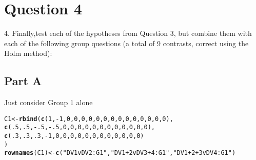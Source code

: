 \documentclass{article}\usepackage[]{graphicx}\usepackage[]{color}
\makeatletter
\newcommand{\hlnum}[1]{\textcolor[rgb]{0.686,0.059,0.569}{#1}}%
\newcommand{\hlstr}[1]{\textcolor[rgb]{0.192,0.494,0.8}{#1}}%
\newcommand{\hlopt}[1]{\textcolor[rgb]{0,0,0}{#1}}%
\newcommand{\hlstd}[1]{\textcolor[rgb]{0.345,0.345,0.345}{#1}}%
\newcommand{\hlkwb}[1]{\textcolor[rgb]{0.69,0.353,0.396}{#1}}%
\newcommand{\hlkwd}[1]{\textcolor[rgb]{0.737,0.353,0.396}{\textbf{#1}}}%
\newenvironment{kframe}{%
 \def\at@end@of@kframe{}%
 \ifinner\ifhmode%
  \def\at@end@of@kframe{\end{minipage}}%
  \begin{minipage}{\columnwidth}%
 \fi\fi%
 \def\FrameCommand##1{\hskip\@totalleftmargin \hskip-\fboxsep
 \colorbox{shadecolor}{##1}\hskip-\fboxsep
     \hskip-\linewidth \hskip-\@totalleftmargin \hskip\columnwidth}%
 \MakeFramed {\advance\hsize-\width
   \@totalleftmargin\z@ \linewidth\hsize
   \@setminipage}}%
 {\par\unskip\endMakeFramed%
 \at@end@of@kframe}
\newenvironment{knitrout}{}{} %
\makeatother
\begin{document}
\section{Question 4}
4. Finally,test each of the hypotheses from Question 3, but combine them with each of the following group questions (a total of 9 contrasts, correct using the Holm method): 

\subsection{Part A}
Just consider Group 1 alone
\begin{knitrout}
\color{fgcolor}\begin{kframe}
\begin{alltt}
\hlstd{C1} \hlkwb{<-} \hlkwd{rbind}\hlstd{(}\hlkwd{c}\hlstd{(} \hlnum{1}\hlstd{,}\hlopt{-}\hlnum{1}\hlstd{,}  \hlnum{0}\hlstd{,}  \hlnum{0}\hlstd{,} \hlnum{0}\hlstd{,}\hlnum{0}\hlstd{,}\hlnum{0}\hlstd{,}\hlnum{0}\hlstd{,} \hlnum{0}\hlstd{,}\hlnum{0}\hlstd{,}\hlnum{0}\hlstd{,}\hlnum{0}\hlstd{,} \hlnum{0}\hlstd{,}\hlnum{0}\hlstd{,}\hlnum{0}\hlstd{,}\hlnum{0}\hlstd{),}
      \hlkwd{c}\hlstd{(}\hlnum{.5}\hlstd{,}\hlnum{.5}\hlstd{,}\hlopt{-}\hlnum{.5}\hlstd{,}\hlopt{-}\hlnum{.5}\hlstd{,} \hlnum{0}\hlstd{,}\hlnum{0}\hlstd{,}\hlnum{0}\hlstd{,}\hlnum{0}\hlstd{,} \hlnum{0}\hlstd{,}\hlnum{0}\hlstd{,}\hlnum{0}\hlstd{,}\hlnum{0}\hlstd{,} \hlnum{0}\hlstd{,}\hlnum{0}\hlstd{,}\hlnum{0}\hlstd{,}\hlnum{0}\hlstd{),}
      \hlkwd{c}\hlstd{(}\hlnum{.3}\hlstd{,}\hlnum{.3}\hlstd{,} \hlnum{.3}\hlstd{,} \hlopt{-}\hlnum{1}\hlstd{,} \hlnum{0}\hlstd{,}\hlnum{0}\hlstd{,}\hlnum{0}\hlstd{,}\hlnum{0}\hlstd{,} \hlnum{0}\hlstd{,}\hlnum{0}\hlstd{,}\hlnum{0}\hlstd{,}\hlnum{0}\hlstd{,} \hlnum{0}\hlstd{,}\hlnum{0}\hlstd{,}\hlnum{0}\hlstd{,}\hlnum{0}\hlstd{)}
\hlstd{)}
\hlkwd{rownames}\hlstd{(C1)} \hlkwb{<-} \hlkwd{c}\hlstd{(}\hlstr{"DV1vDV2:G1"}\hlstd{,} \hlstr{"DV1+2vDV3+4:G1"}\hlstd{,} \hlstr{"DV1+2+3vDV4:G1"}\hlstd{)}
\end{alltt}
\end{kframe}
\end{knitrout}
\end{document}
